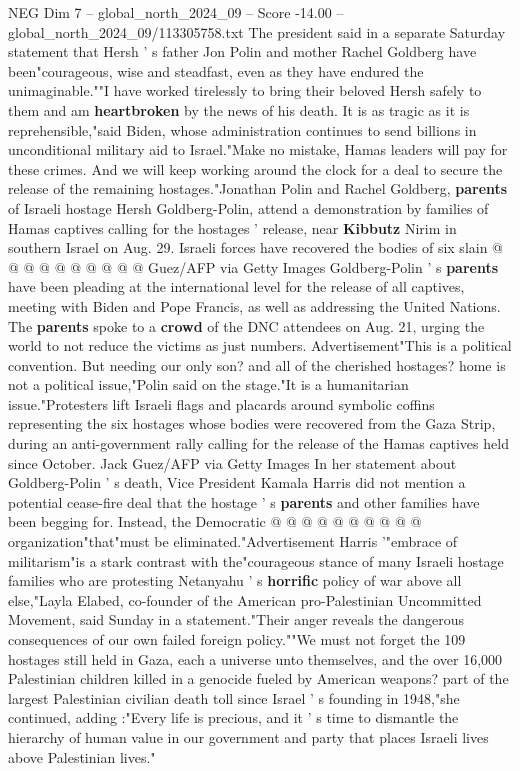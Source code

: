 \begin{textsample}{NEG Dim 7 – global\_north\_2024\_09 – Score -14.00 – global\_north\_2024\_09/113305758.txt}
The president said in a separate Saturday statement that Hersh ' s father Jon Polin and mother Rachel Goldberg have been"courageous, wise and steadfast, even as they have endured the unimaginable.""I have worked tirelessly to bring their beloved Hersh safely to them and am \textbf{heartbroken} by the news of his death.
It is as tragic as it is reprehensible,"said Biden, whose administration continues to send billions in unconditional military aid to Israel."Make no mistake, Hamas leaders will pay for these crimes.
And we will keep working around the clock for a deal to secure the release of the remaining hostages."Jonathan Polin and Rachel Goldberg, \textbf{parents} of Israeli hostage Hersh Goldberg-Polin, attend a demonstration by families of Hamas captives calling for the hostages ' release, near \textbf{Kibbutz} Nirim in southern Israel on Aug. 29.
Israeli forces have recovered the bodies of six slain @ @ @ @ @ @ @ @ @ @ Guez/AFP via Getty Images Goldberg-Polin ' s \textbf{parents} have been pleading at the international level for the release of all captives, meeting with Biden and Pope Francis, as well as addressing the United Nations.
The \textbf{parents} spoke to a \textbf{crowd} of the DNC attendees on Aug. 21, urging the world to not reduce the victims as just numbers.
Advertisement"This is a political convention.
But needing our only son? and all of the cherished hostages? home is not a political issue,"Polin said on the stage."It is a humanitarian issue."Protesters lift Israeli flags and placards around symbolic coffins representing the six hostages whose bodies were recovered from the Gaza Strip, during an anti-government rally calling for the release of the Hamas captives held since October.
Jack Guez/AFP via Getty Images In her statement about Goldberg-Polin ' s death, Vice President Kamala Harris did not mention a potential cease-fire deal that the hostage ' s \textbf{parents} and other families have been begging for.
Instead, the Democratic @ @ @ @ @ @ @ @ @ @ organization"that"must be eliminated."Advertisement Harris '"embrace of militarism"is a stark contrast with the"courageous stance of many Israeli hostage families who are protesting Netanyahu ' s \textbf{horrific} policy of war above all else,"Layla Elabed, co-founder of the American pro-Palestinian Uncommitted Movement, said Sunday in a statement."Their anger reveals the dangerous consequences of our own failed foreign policy.""We must not forget the 109 hostages still held in Gaza, each a universe unto themselves, and the over 16,000 Palestinian children killed in a genocide fueled by American weapons? part of the largest Palestinian civilian death toll since Israel ' s founding in 1948,"she continued, adding :"Every life is precious, and it ' s time to dismantle the hierarchy of human value in our government and party that places Israeli lives above Palestinian lives."

\end{textsample}
